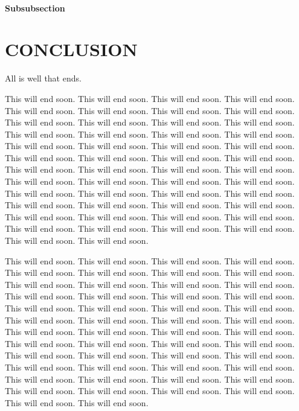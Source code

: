 \documentclass[12pt,econ]{sources/authesis}
\theoremstyle{definition}
\theoremstyle{definition}
\theoremstyle{definition}
\theoremstyle{remark}
\begin{document}
\subsubsection{Subsubsection}\label{subsubsection-2}

\chapter{CONCLUSION}\label{conclusion}

All is well that ends.

This will end soon. This will end soon. This will end soon. This will
end soon. This will end soon. This will end soon. This will end soon.
This will end soon. This will end soon. This will end soon. This will
end soon. This will end soon. This will end soon. This will end soon.
This will end soon. This will end soon. This will end soon. This will
end soon. This will end soon. This will end soon. This will end soon.
This will end soon. This will end soon. This will end soon. This will
end soon. This will end soon. This will end soon. This will end soon.
This will end soon. This will end soon. This will end soon. This will
end soon. This will end soon. This will end soon. This will end soon.
This will end soon. This will end soon. This will end soon. This will
end soon. This will end soon. This will end soon. This will end soon.
This will end soon. This will end soon. This will end soon. This will
end soon. This will end soon. This will end soon. This will end soon.
This will end soon.

This will end soon. This will end soon. This will end soon. This will
end soon. This will end soon. This will end soon. This will end soon.
This will end soon. This will end soon. This will end soon. This will
end soon. This will end soon. This will end soon. This will end soon.
This will end soon. This will end soon. This will end soon. This will
end soon. This will end soon. This will end soon. This will end soon.
This will end soon. This will end soon. This will end soon. This will
end soon. This will end soon. This will end soon. This will end soon.
This will end soon. This will end soon. This will end soon. This will
end soon. This will end soon. This will end soon. This will end soon.
This will end soon. This will end soon. This will end soon. This will
end soon. This will end soon. This will end soon. This will end soon.
This will end soon. This will end soon. This will end soon. This will
end soon. This will end soon. This will end soon. This will end soon.
This will end soon.
\end{document}
